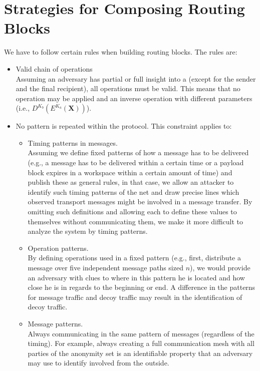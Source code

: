 \section{Strategies for Composing Routing Blocks}\label{sec:routingStrategies}
We have to follow certain rules when building routing blocks. The rules are:
\begin{itemize}
	\item Valid chain of operations\\
	Assuming an adversary has partial or full insight into a  (except for the sender and the final recipient), all operations must be valid. This means that no operation may be applied and an inverse operation with different parameters  (i.e., $D^{K_b}\left(E^{K_a}\left(\textbf{X}\right)\right)$).
	\item No pattern is repeated within the protocol. This constraint applies to:
	\begin{itemize}
		\item Timing patterns in messages.\\
		Assuming we define fixed patterns of how a message has to be delivered (e.g., a message has to be delivered within a certain time or a payload block expires in a workspace within a certain amount of time) and publish these as general rules, in that case, we allow an attacker to identify such timing patterns of the net and draw precise lines which observed transport messages might be involved in a message transfer. By omitting such definitions and allowing each  to define these values to themselves without communicating them, we make it more difficult to analyze the system by timing patterns.
		\item Operation patterns.\\
		By defining operations used in a fixed pattern (e.g., first, distribute a message over five independent message paths sized $n$), we would provide an adversary with clues to where in this pattern he is located and how close he is in regards to the beginning or end. A difference in the patterns for message traffic and decoy traffic may result in the identification of decoy traffic.
		\item Message patterns.\\
		Always communicating in the same pattern of messages (regardless of the timing). For example, always creating a full communication mesh with all parties of the anonymity set is an identifiable property that an adversary may use to identify involved \VortexNodes{} from the outside.

\end{itemize}
\end{itemize}
